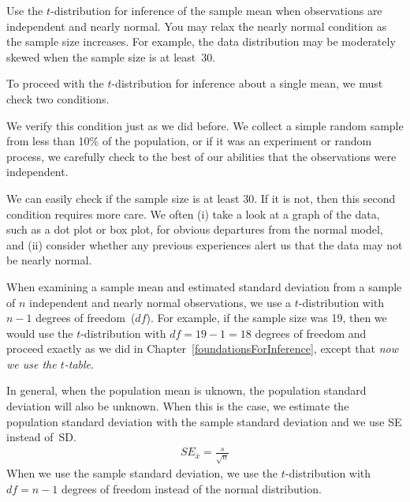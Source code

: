 \begin{tipBox}{
Use the $t$-distribution for inference of the sample mean when observations are independent and nearly normal. You may relax the nearly normal condition as the sample size increases. For example, the data distribution may be moderately skewed when the sample size is at least~30.
}
\end{tipBox}


To proceed with the $t$-distribution for inference about a single mean, we must check two conditions.
\begin{description}
\setlength{\itemsep}{0mm}
\item[Independence of observations.] We verify this condition just as we did before. We collect a simple random sample from less than 10\% of the population, or if it was an experiment or random process, we carefully check to the best of our abilities that the observations were independent.
\item[$\mathbf{n\ge 30}$ or observations come from a nearly normal distribution.] We can easily check if the sample size is at least 30. If it is not, then this second condition requires more care. We often (i) take a look at a graph of the data, such as a dot plot or box plot, for obvious departures from the normal model, and (ii) consider whether any previous experiences alert us that the data may not be nearly normal.
\end{description}
When examining a sample mean and estimated standard deviation from a sample of $n$ independent and nearly normal observations, we use a $t$-distribution with $n-1$ degrees of freedom~($df$). For example, if the sample size was 19, then we would use the $t$-distribution with $df=19-1=18$ degrees of freedom and proceed exactly as we did in Chapter~\ref{foundationsForInference}, except that \emph{now we use the $t$-table}.

\begin{termBox}{
In general, when the population mean is uknown, the population standard deviation will also be unknown. When this is the case, we estimate the population standard deviation with the sample standard deviation and we use SE instead of~SD.
\begin{align*}
SE_{\bar{x}}=\frac{s}{\sqrt{n}}
\end{align*}
When we use the sample standard deviation, we use the $t$-distribution with $df=n-1$ degrees of freedom instead of the normal distribution.}
\end{termBox}

